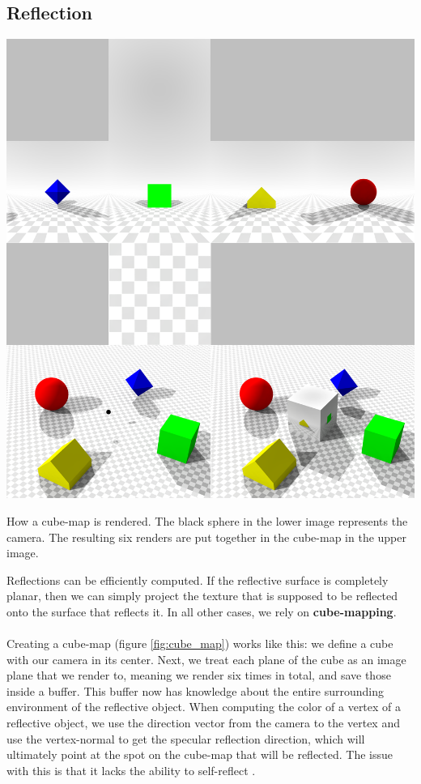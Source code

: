 \documentclass{ACGSeminar}
\begin{document}
	\subsection{Reflection} \label{sec:reflection}
		\begin{floatingfigure}[r]{.7\textwidth}%
			\includegraphics[width=.7\textwidth]{img/cube_map.png}
			\caption{How a cube-map is rendered. The black sphere in the lower image represents the camera. The resulting six renders are put together in the cube-map in the upper image.}%
			\label{fig:cube_map}%
		\end{floatingfigure}%
		Reflections can be efficiently computed. If the reflective surface is completely planar, then we can simply project the texture that is supposed to be reflected onto the surface that reflects it. In all other cases, we rely on \textbf{cube-mapping}. \\\\
		Creating a cube-map (figure \ref{fig:cube_map}) works like this: we define a cube with our camera in its center. Next, we treat each plane of the cube as an image plane that we render to, meaning we render six times in total, and save those inside a buffer. This buffer now has knowledge about the entire surrounding environment of the reflective object. When computing the color of a vertex of a reflective object, we use the direction vector from the camera to the vertex and use the vertex-normal to get the specular reflection direction, which will ultimately point at the spot on the cube-map that will be reflected. The issue with this is that it lacks the ability to self-reflect \cite{REFL}. \\\\
\end{document}
